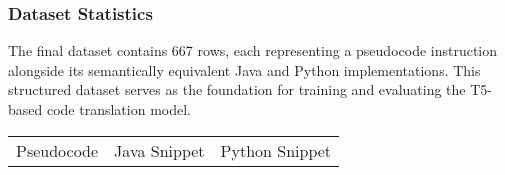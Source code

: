 \documentclass{dhbenelux}
\begin{document}
\subsubsection{Dataset Statistics}

The final dataset contains 667 rows, each representing a pseudocode instruction alongside its semantically equivalent Java and Python implementations. This structured dataset serves as the foundation for training and evaluating the T5-based code translation model.

\begin{table}[h!]
\centering
\begin{tabular}{|c|c|c|}

\hline
\begin{minipage}[t]{0.3\textwidth}
Pseudocode
\end{minipage}
&
\begin{minipage}[t]{0.3\textwidth}
Java Snippet
\end{minipage}
&
\begin{minipage}[t]{0.3\textwidth}
Python Snippet
\end{minipage}
\\




\end{tabular}
\end{table}
\end{document}
